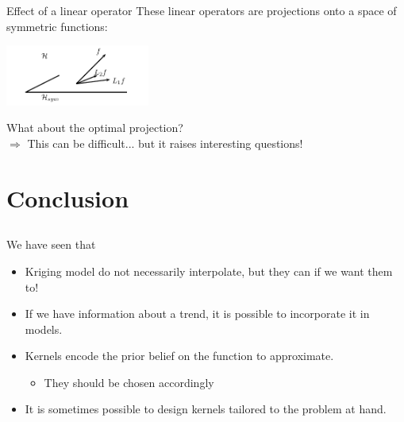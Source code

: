 \documentclass{beamer}
\begin{document}
\begin{frame}{Effect of a linear operator}
These linear operators are projections onto a space of symmetric functions:
\begin{center}
\vspace{0.5cm}
 \includegraphics[height=2cm]{figures/proj-sym}
\vspace{0.5cm}
\end{center}
What about the optimal projection?\\
\vspace{0.5cm}
\alert{$\Rightarrow$ This can be difficult... but it raises interesting questions!}
\end{frame}

\section{Conclusion}
\subsection{}


\begin{frame}{}
We have seen that \vspace{2mm}
\begin{itemize}
 \item Kriging model do not necessarily interpolate, but they can if we want them to!
 \item If we have information about a trend, it is possible to incorporate it in models.
 \item Kernels encode the prior belief on the function to approximate.
 \begin{itemize}
 	\item They should be chosen accordingly
 \end{itemize}
 \item It is sometimes possible to design kernels tailored to the problem at hand.
\end{itemize}
\end{frame}



\end{document}
